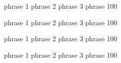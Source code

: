 phrase 1 phrase 2 phrase 3 phrase 100

phrase 1 phrase 2 phrase 3 phrase 100

phrase 1 phrase 2 phrase 3 phrase 100

phrase 1 phrase 2 phrase 3 phrase 100

